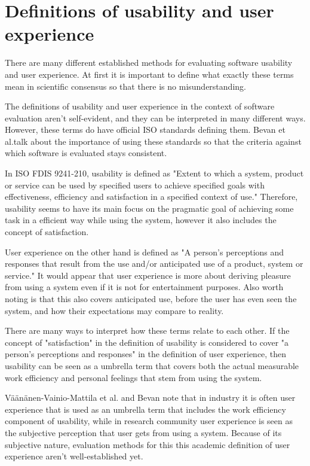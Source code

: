 \section{Definitions of usability and user experience}\label{definitions_section}

There are many different established methods for evaluating software usability and user experience. At first it is important to define what exactly these terms mean in scientific consensus so that there is no misunderstanding.

The definitions of usability and user experience in the context of software evaluation aren't self-evident, and they can be interpreted in many different ways. However, these terms do have official ISO standards defining them. Bevan et al.talk about the importance of using these standards so that the criteria against which software is evaluated stays consistent. \cite{bevanstandard}

In  ISO FDIS 9241-210, usability is defined as "Extent to which  a system, product or service can be used by specified users to achieve specified goals with effectiveness, efficiency and satisfaction in a specified context of use." Therefore, usability seems to have its main focus on the pragmatic goal of achieving some task in a efficient way while using the system, however it also includes the concept of satisfaction.

User experience on the other hand is defined as "A person's perceptions and responses that result from the use and/or anticipated use of a product, system or service." It would appear that user experience is more about deriving pleasure from using a system even if it is not for entertainment purposes. Also worth noting is that this also covers anticipated use, before the user has even seen the system, and how their expectations may compare to reality.

There are many ways to interpret how these terms relate to each other. If the concept of "satisfaction" in the definition of usability is considered to cover "a person's perceptions and responses" in the definition of user experience, then usability can be seen as a umbrella term that covers both the actual measurable work efficiency and personal feelings that stem from using the system.

Väänänen-Vainio-Mattila et al. and Bevan note that in industry it is often user experience that is used as an umbrella term that includes the work efficiency component of usability, while in research community user experience is seen as the subjective perception that user gets from using a system. Because of its subjective nature, evaluation methods for this this academic definition of user experience aren't well-established yet. \cite{bevan2009difference, vaananen2008towards}

